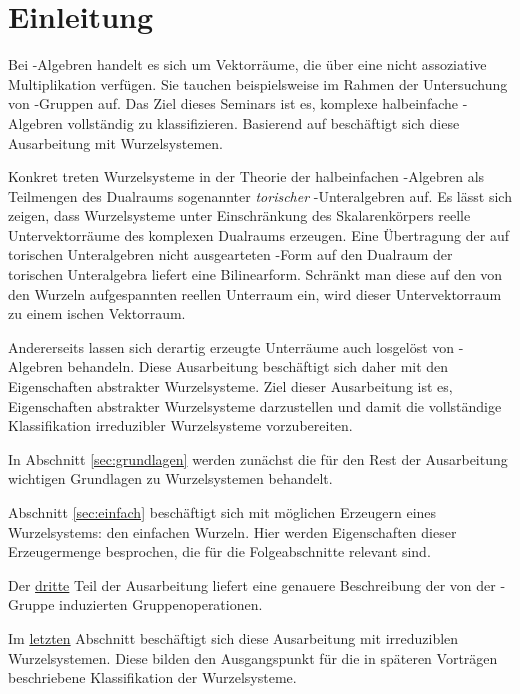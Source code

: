 \section*{Einleitung}

Bei \lie\hyp{}Algebren handelt es sich um Vektorräume, die über eine nicht assoziative Multiplikation verfügen.
Sie tauchen beispielsweise im Rahmen der Untersuchung von \lie\hyp{}Gruppen auf.
Das Ziel dieses Seminars ist es, komplexe halbeinfache \lie\hyp{}Algebren vollständig zu klassifizieren.
Basierend auf \cite[S.49-55]{humphreys1972introduction} beschäftigt sich diese Ausarbeitung mit Wurzelsystemen.

Konkret treten Wurzelsysteme in der Theorie der halbeinfachen \lie\hyp{}Algebren als Teilmengen des Dualraums sogenannter \emph{torischer} \lie\hyp{}Unteralgebren auf.
Es lässt sich zeigen, dass Wurzelsysteme unter Einschränkung des Skalarenkörpers reelle Untervektorräume des komplexen Dualraums erzeugen.
Eine Übertragung der auf torischen Unteralgebren nicht ausgearteten \killing\hyp{}Form auf den Dualraum der torischen Unteralgebra liefert eine Bilinearform.
Schränkt man diese auf den von den Wurzeln aufgespannten reellen Unterraum ein, wird dieser Untervektorraum zu einem \euklid ischen Vektorraum.

Andererseits lassen sich derartig erzeugte Unterräume auch losgelöst von \lie\hyp{}Algebren behandeln.
Diese Ausarbeitung beschäftigt sich daher mit den Eigenschaften abstrakter Wurzelsysteme.
Ziel dieser Ausarbeitung ist es, Eigenschaften abstrakter Wurzelsysteme darzustellen und damit die vollständige Klassifikation irreduzibler Wurzelsysteme vorzubereiten.

In Abschnitt \ref{sec:grundlagen} werden zunächst die für den Rest der Ausarbeitung wichtigen Grundlagen zu Wurzelsystemen behandelt.

Abschnitt \ref{sec:einfach} beschäftigt sich mit möglichen Erzeugern eines Wurzelsystems: den einfachen Wurzeln. 
Hier werden Eigenschaften dieser Erzeugermenge besprochen, die für die Folgeabschnitte relevant sind.

Der \hyperref[sec:weylgroup]{dritte} Teil der Ausarbeitung liefert eine genauere Beschreibung der von der \weyl\hyp{}Gruppe induzierten Gruppenoperationen.

Im \hyperref[sec:irreduc]{letzten} Abschnitt beschäftigt sich diese Ausarbeitung mit irreduziblen Wurzelsystemen. 
Diese bilden den Ausgangspunkt für die in späteren Vorträgen beschriebene Klassifikation der Wurzelsysteme.
